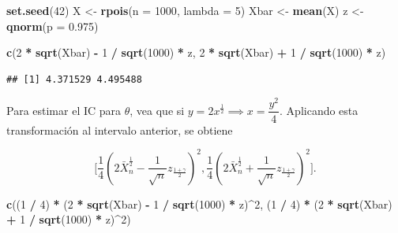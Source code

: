 \documentclass[
  12pt,
]{book}
\newenvironment{Shaded}{\begin{snugshade}}{\end{snugshade}}
\newcommand{\DataTypeTok}[1]{\textcolor[rgb]{0.13,0.29,0.53}{#1}}
\newcommand{\DecValTok}[1]{\textcolor[rgb]{0.00,0.00,0.81}{#1}}
\newcommand{\FloatTok}[1]{\textcolor[rgb]{0.00,0.00,0.81}{#1}}
\newcommand{\KeywordTok}[1]{\textcolor[rgb]{0.13,0.29,0.53}{\textbf{#1}}}
\newcommand{\NormalTok}[1]{#1}
\newcommand{\OperatorTok}[1]{\textcolor[rgb]{0.81,0.36,0.00}{\textbf{#1}}}
\newcommand{\StringTok}[1]{\textcolor[rgb]{0.31,0.60,0.02}{#1}}
\begin{document}
\begin{Shaded}
\begin{Highlighting}[]
\KeywordTok{set.seed}\NormalTok{(}\DecValTok{42}\NormalTok{)}
\NormalTok{X \textless{}{-}}\StringTok{ }\KeywordTok{rpois}\NormalTok{(}\DataTypeTok{n =} \DecValTok{1000}\NormalTok{, }\DataTypeTok{lambda =} \DecValTok{5}\NormalTok{)}
\NormalTok{Xbar \textless{}{-}}\StringTok{ }\KeywordTok{mean}\NormalTok{(X)}
\NormalTok{z \textless{}{-}}\StringTok{ }\KeywordTok{qnorm}\NormalTok{(}\DataTypeTok{p =} \FloatTok{0.975}\NormalTok{)}

\KeywordTok{c}\NormalTok{(}\DecValTok{2} \OperatorTok{*}\StringTok{ }\KeywordTok{sqrt}\NormalTok{(Xbar) }\OperatorTok{{-}}\StringTok{ }\DecValTok{1} \OperatorTok{/}\StringTok{ }\KeywordTok{sqrt}\NormalTok{(}\DecValTok{1000}\NormalTok{) }\OperatorTok{*}\StringTok{ }\NormalTok{z, }\DecValTok{2} \OperatorTok{*}\StringTok{ }\KeywordTok{sqrt}\NormalTok{(Xbar) }\OperatorTok{+}\StringTok{ }\DecValTok{1} \OperatorTok{/}\StringTok{ }\KeywordTok{sqrt}\NormalTok{(}\DecValTok{1000}\NormalTok{) }\OperatorTok{*}\StringTok{ }\NormalTok{z)}
\end{Highlighting}
\end{Shaded}

\begin{verbatim}
## [1] 4.371529 4.495488
\end{verbatim}

Para estimar el IC para \(\theta\), vea que si \(y=2x^{\frac12} \implies x = \dfrac{y^2}{4}\). Aplicando esta transformación al intervalo anterior, se obtiene

\[\bigg[\dfrac 14 \left(2\bar X_n^{\frac 12} -\dfrac 1{\sqrt n}
z_{\frac{1+\gamma}2}\right)^2,\dfrac 14 \left(2\bar X_n^{\frac 12} +\dfrac 1{\sqrt n}
z_{\frac{1+\gamma}2}\right)^2\bigg].\]

\begin{Shaded}
\begin{Highlighting}[]
\KeywordTok{c}\NormalTok{((}\DecValTok{1} \OperatorTok{/}\StringTok{ }\DecValTok{4}\NormalTok{) }\OperatorTok{*}\StringTok{ }\NormalTok{(}\DecValTok{2} \OperatorTok{*}\StringTok{ }\KeywordTok{sqrt}\NormalTok{(Xbar) }\OperatorTok{{-}}\StringTok{ }\DecValTok{1} \OperatorTok{/}\StringTok{ }\KeywordTok{sqrt}\NormalTok{(}\DecValTok{1000}\NormalTok{) }\OperatorTok{*}\StringTok{ }\NormalTok{z)}\OperatorTok{\^{}}\DecValTok{2}\NormalTok{, (}\DecValTok{1} \OperatorTok{/}\StringTok{ }\DecValTok{4}\NormalTok{) }\OperatorTok{*}\StringTok{ }\NormalTok{(}\DecValTok{2} \OperatorTok{*}\StringTok{ }\KeywordTok{sqrt}\NormalTok{(Xbar) }\OperatorTok{+}\StringTok{ }\DecValTok{1} \OperatorTok{/}\StringTok{ }\KeywordTok{sqrt}\NormalTok{(}\DecValTok{1000}\NormalTok{) }\OperatorTok{*}\StringTok{ }\NormalTok{z)}\OperatorTok{\^{}}\DecValTok{2}\NormalTok{)}
\end{Highlighting}
\end{Shaded}
\end{document}
